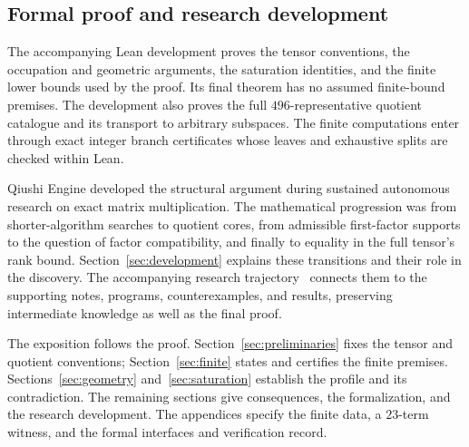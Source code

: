 \subsection{Formal proof and research development}
The accompanying Lean development proves the tensor conventions,
the occupation and geometric arguments, the saturation identities, and
the finite lower bounds used by the proof. Its final theorem has no
assumed finite-bound premises. The development also proves the full
$496$-representative quotient catalogue and its transport to arbitrary
subspaces. The finite computations enter through exact integer branch
certificates whose leaves and exhaustive splits are checked within Lean.

Qiushi Engine developed the structural argument during sustained
autonomous research on exact matrix multiplication.
The mathematical progression was from shorter-algorithm searches to
quotient cores, from admissible first-factor supports to the question
of factor compatibility, and finally to equality in the full tensor's
rank bound. Section~\ref{sec:development} explains these transitions
and their role in the discovery. The accompanying research
trajectory~\cite{qiushi-report} connects them to the supporting notes,
programs, counterexamples, and results, preserving intermediate
knowledge as well as the final proof.

The exposition follows the proof. Section~\ref{sec:preliminaries} fixes
the tensor and quotient conventions; Section~\ref{sec:finite} states
and certifies the finite premises. Sections~\ref{sec:geometry}
and~\ref{sec:saturation} establish the profile and its contradiction.
The remaining sections give consequences, the formalization, and the
research development. The appendices specify the finite data, a
$23$-term witness, and the formal interfaces and verification record.
